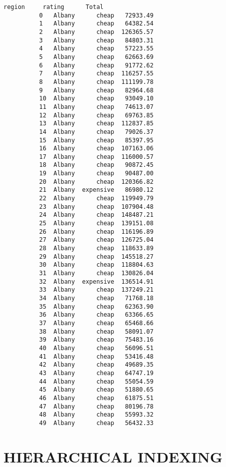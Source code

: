 \documentclass[11pt]{article}
\begin{document}
\begin{Verbatim}[commandchars=\\\{\}]
              region     rating      Total  
          0   Albany      cheap   72933.49  
          1   Albany      cheap   64382.54  
          2   Albany      cheap  126365.57  
          3   Albany      cheap   84803.31  
          4   Albany      cheap   57223.55  
          5   Albany      cheap   62663.69  
          6   Albany      cheap   91772.62  
          7   Albany      cheap  116257.55  
          8   Albany      cheap  111199.78  
          9   Albany      cheap   82964.68  
          10  Albany      cheap   93049.10  
          11  Albany      cheap   74613.07  
          12  Albany      cheap   69763.85  
          13  Albany      cheap  112837.85  
          14  Albany      cheap   79026.37  
          15  Albany      cheap   85397.95  
          16  Albany      cheap  107163.06  
          17  Albany      cheap  116000.57  
          18  Albany      cheap   90872.45  
          19  Albany      cheap   90487.00  
          20  Albany      cheap  120366.82  
          21  Albany  expensive   86980.12  
          22  Albany      cheap  119949.79  
          23  Albany      cheap  107904.48  
          24  Albany      cheap  148487.21  
          25  Albany      cheap  139151.08  
          26  Albany      cheap  116196.89  
          27  Albany      cheap  126725.04  
          28  Albany      cheap  118633.89  
          29  Albany      cheap  145518.27  
          30  Albany      cheap  118804.63  
          31  Albany      cheap  130826.04  
          32  Albany  expensive  136514.91  
          33  Albany      cheap  137249.21  
          34  Albany      cheap   71768.18  
          35  Albany      cheap   62363.90  
          36  Albany      cheap   63366.65  
          37  Albany      cheap   65468.66  
          38  Albany      cheap   58091.07  
          39  Albany      cheap   75483.16  
          40  Albany      cheap   56096.51  
          41  Albany      cheap   53416.48  
          42  Albany      cheap   49689.35  
          43  Albany      cheap   64747.19  
          44  Albany      cheap   55054.59  
          45  Albany      cheap   51880.65  
          46  Albany      cheap   61875.51  
          47  Albany      cheap   80196.78  
          48  Albany      cheap   55993.32  
          49  Albany      cheap   56432.33  
\end{Verbatim}
            
    \section{HIERARCHICAL INDEXING}\label{hierarchical-indexing}
\end{document}
